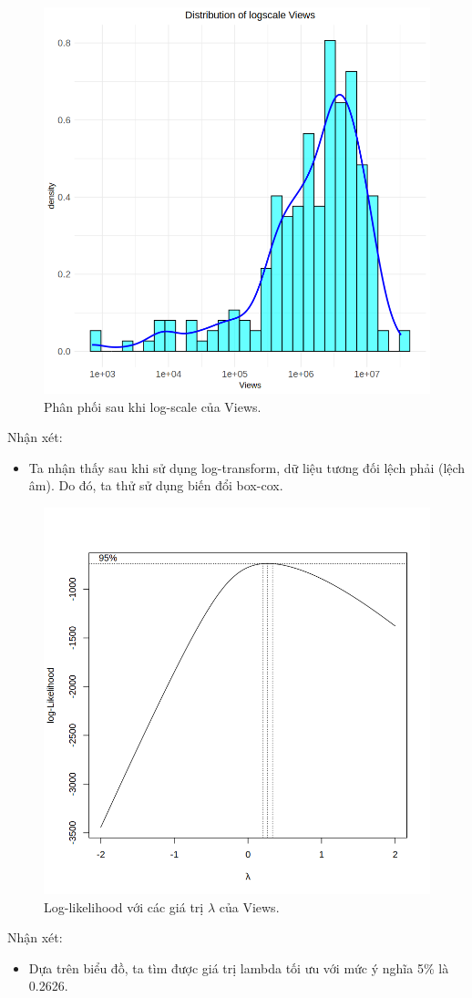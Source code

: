 \begin{figure}[H]
    \centering
    \includegraphics[width=0.75\columnwidth]{csm_figures/views_logscale_distribution.png}
    \caption{Phân phối sau khi log-scale của Views.}
    \label{fig:views_logscale_distribution}
\end{figure}
Nhận xét:
\begin{itemize}
    \item Ta nhận thấy sau khi sử dụng log-transform, dữ liệu tương đối lệch phải (lệch âm). Do đó, ta thử sử dụng biến đổi box-cox.
\end{itemize}

\begin{figure}[H]
    \centering
    \includegraphics[width=0.75\columnwidth]{csm_figures/views_optimal_lambda.png}
    \caption{Log-likelihood với các giá trị $\lambda$ của Views.}
    \label{fig:views_optimal_lambda}
\end{figure}
Nhận xét:
\begin{itemize}
    \item Dựa trên biểu đồ, ta tìm được giá trị lambda tối ưu với mức ý nghĩa 5\% là 0.2626.
\end{itemize}

